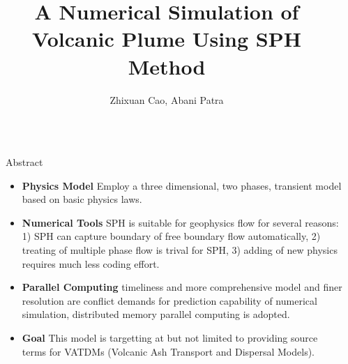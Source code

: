 \documentclass[final]{beamer}
\title{A Numerical Simulation of Volcanic Plume Using SPH Method} %
\author{Zhixuan Cao, Abani Patra} %
\institute{Department of Aerospace and Mechinical Engineering, University at Buffalo, SUNY} %
\newlength{\sepwid}
\newlength{\onecolwid}
\begin{document}

\setlength{\belowcaptionskip}{2ex} %
\setlength\belowdisplayshortskip{2ex} %

\begin{frame}[t] %

\begin{columns}[t] %

\begin{column}{\sepwid}\end{column} %

\begin{column}{\onecolwid} %


\begin{alertblock}{Abstract}
\begin{itemize}
\item \textbf{Physics Model} Employ a three dimensional, two phases, transient model based on basic physics laws.\
\item \textbf{Numerical Tools} SPH is suitable for geophysics flow for several reasons: 1) SPH can capture boundary of free boundary flow automatically, 2) treating of multiple phase flow is trival for SPH, 3) adding of new physics requires much less coding effort.\
\item \textbf{Parallel Computing} timeliness and more comprehensive model and finer resolution are conflict demands for prediction capability of numerical simulation, distributed memory parallel computing is adopted.
\item \textbf{Goal} This model is targetting at but not limited to providing source terms for VATDMs (Volcanic Ash Transport and Dispersal Models).
\end{itemize}
\end{alertblock}


\end{column}
\end{columns}
\end{frame}
\end{document}
